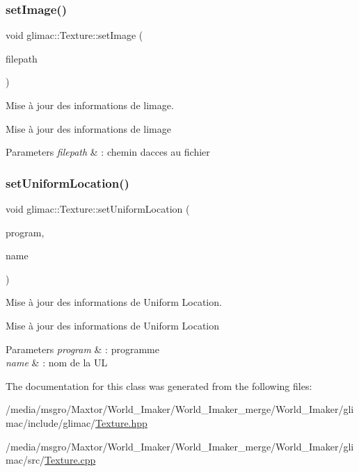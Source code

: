 \subsubsection{\texorpdfstring{set\+Image()}{setImage()}}
{\footnotesize\ttfamily void glimac\+::\+Texture\+::set\+Image (\begin{DoxyParamCaption}\item[{const \hyperlink{classglimac_1_1FilePath}{File\+Path} \&}]{filepath }\end{DoxyParamCaption})}



Mise à jour des informations de l\textquotesingle{}image. 

Mise à jour des informations de l\textquotesingle{}image


\begin{DoxyParams}{Parameters}
{\em filepath} & \+: chemin d\textquotesingle{}acces au fichier \\
\hline
\end{DoxyParams}
\mbox{\label{classglimac_1_1Texture_a2a1e06217a8c98f4ddd7c271b7590c03}} 
\subsubsection{\texorpdfstring{set\+Uniform\+Location()}{setUniformLocation()}}
{\footnotesize\ttfamily void glimac\+::\+Texture\+::set\+Uniform\+Location (\begin{DoxyParamCaption}\item[{\hyperlink{classglimac_1_1Program}{Program} \&}]{program,  }\item[{const G\+Lchar $\ast$}]{name }\end{DoxyParamCaption})}



Mise à jour des informations de Uniform Location. 

Mise à jour des informations de Uniform Location


\begin{DoxyParams}{Parameters}
{\em program} & \+: programme \\
\hline
{\em name} & \+: nom de la UL \\
\hline
\end{DoxyParams}


The documentation for this class was generated from the following files\+:\begin{DoxyCompactItemize}
\item 
/media/msgro/\+Maxtor/\+World\+\_\+\+Imaker/\+World\+\_\+\+Imaker\+\_\+merge/\+World\+\_\+\+Imaker/glimac/include/glimac/\hyperlink{Texture_8hpp}{Texture.\+hpp}\item 
/media/msgro/\+Maxtor/\+World\+\_\+\+Imaker/\+World\+\_\+\+Imaker\+\_\+merge/\+World\+\_\+\+Imaker/glimac/src/\hyperlink{Texture_8cpp}{Texture.\+cpp}\end{DoxyCompactItemize}
